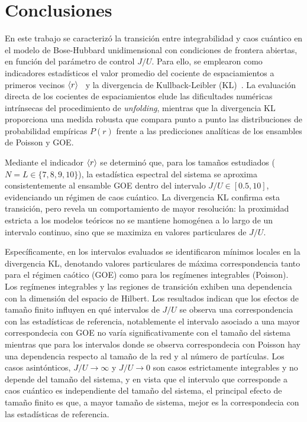 \documentclass[10pt,a4paper]{article}
\begin{document}
\section{Conclusiones}
En este trabajo se caracterizó la transición entre integrabilidad y caos cuántico en el modelo de Bose-Hubbard unidimensional con condiciones de frontera abiertas, en función del parámetro de control $J/U$. Para ello, se emplearon como indicadores estadísticos el valor promedio del cociente de espaciamientos a primeros vecinos $\ev{r}$~\cite{Atas_2013,oganesyan2007localization} y 
la divergencia de Kullback-Leibler (KL)~\cite{kullback1951information}. La evaluación directa de los cocientes de espaciamientos elude las dificultades numéricas intrínsecas del procedimiento de \textit{unfolding}, 
mientras que la divergencia KL proporciona una medida robusta que compara punto a punto las distribuciones de probabilidad empíricas $P(r)$ frente a las predicciones analíticas de los ensambles de Poisson y GOE.

Mediante el indicador $\ev{r}$ se determinó que, para los tamaños estudiados ($N=L \in \{7, 8, 9, 10\}$), 
la estadística espectral del sistema se aproxima consistentemente al ensamble GOE dentro del intervalo $J/U \in [0.5, 10]$, evidenciando un régimen de caos cuántico. 
La divergencia KL confirma esta transición, pero revela un comportamiento de mayor resolución: la proximidad estricta a los modelos teóricos no se mantiene homogénea a lo largo de un intervalo continuo, sino que se maximiza en valores particulares de $J/U$.

Específicamente, en los intervalos evaluados se identificaron mínimos locales en la divergencia KL, denotando valores particulares de máxima correspondencia tanto para el régimen caótico (GOE) como para los regímenes integrables (Poisson). Los regímenes integrables y las regiones de transición exhiben una dependencia con la dimensión del espacio de Hilbert. Los resultados indican que los efectos de tamaño finito influyen en qué intervalos de $J/U$ se observa una correspondencia con las estadísticas de referencia, notablemente el intervalo asociado a una mayor correspondecia con GOE no varía significativamente con el tamaño del sistema mientras que para los intervalos donde se observa correspondecia con Poisson hay una dependencia respecto al tamaño de la red y al número de partículas. Los casos asintónticos, $J/U \rightarrow \infty$ y $J/U\rightarrow 0$ son casos estrictamente integrables y no depende del tamaño del sistema, y en vista que el intervalo que corresponde a caos cuántico es independiente del tamaño del sistema, el principal efecto de tamaño finito es que, a mayor tamaño de sistema, mejor es la correspondecia con las estadísticas de referencia.
\end{document}
